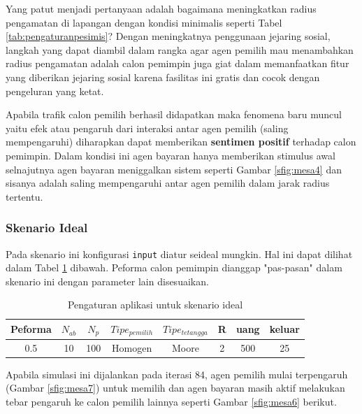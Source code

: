 Yang patut menjadi pertanyaan adalah bagaimana meningkatkan radius pengamatan di lapangan dengan kondisi minimalis seperti Tabel \ref{tab:pengaturanpesimis}? Dengan meningkatnya penggunaan jejaring sosial, langkah yang dapat diambil dalam rangka agar agen pemilih mau menambahkan radius pengamatan adalah calon pemimpin juga giat dalam memanfaatkan fitur yang diberikan jejaring sosial karena fasilitas ini gratis dan cocok dengan pengeluran yang ketat.

Apabila trafik calon pemilih berhasil didapatkan maka fenomena baru muncul yaitu efek atau pengaruh dari interaksi antar agen pemilih (saling mempengaruhi) diharapkan dapat memberikan \textbf{sentimen positif} terhadap calon pemimpin. Dalam kondisi ini agen bayaran hanya memberikan stimulus awal selnajutnya agen bayaran meniggalkan sistem seperti Gambar \ref{sfig:mesa4} dan sisanya adalah saling mempengaruhi antar agen pemilih dalam jarak radius tertentu.

\subsubsection{Skenario Ideal}

Pada skenario ini konfigurasi \texttt{input} diatur seideal mungkin. Hal ini dapat dilihat dalam Tabel \ref{tab:pengaturanideal} dibawah. Peforma calon pemimpin dianggap "pas-pasan" dalam skenario ini dengan parameter lain disesuaikan.

\begin{table}[H]
\centering
\caption{Pengaturan aplikasi untuk skenario ideal}
\begin{tabular}{cccccccc}
	\hline
	Peforma & $N_{ab}$ & $N_{p}$ & $Tipe_{pemilih}$ & $Tipe_{tetangga}$ & R & uang & keluar \\
	\hline
	0.5 & 10 & 100 & Homogen & Moore & 2 & 500 & 25\\
	\hline
\end{tabular}
\label{tab:pengaturanideal}
\end{table}

Apabila simulasi ini dijalankan pada iterasi 84, agen pemilih mulai terpengaruh (Gambar \ref{sfig:mesa7}) untuk memilih dan agen bayaran masih aktif melakukan tebar pengaruh ke calon pemilih lainnya seperti Gambar \ref{sfig:mesa6} berikut.

